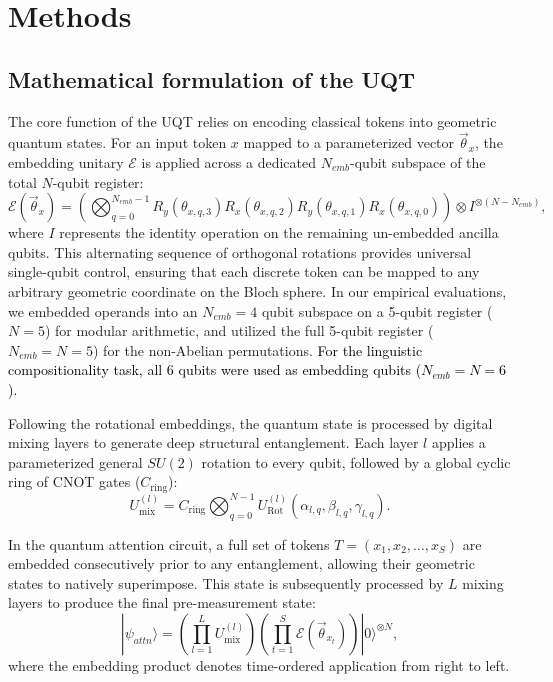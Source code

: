 \documentclass[11pt, a4paper]{article}
\begin{document}
\section*{Methods}\label{sec:methods}
\subsection*{Mathematical formulation of the UQT}
The core function of the UQT relies on encoding classical tokens into geometric quantum states. For an input token $x$ mapped to a parameterized vector $\vec{\theta}_x$, the embedding unitary $\mathcal{E}$ is applied across a dedicated $N_{emb}$-qubit subspace of the total $N$-qubit register:
\begin{equation}
    \mathcal{E}(\vec{\theta}_x) = \left( \bigotimes_{q=0}^{N_{emb}-1} R_y(\theta_{x, q, 3}) R_x(\theta_{x, q, 2}) R_y(\theta_{x, q, 1}) R_x(\theta_{x, q, 0}) \right) \otimes I^{\otimes (N - N_{emb})},
\end{equation}
where $I$ represents the identity operation on the remaining un-embedded ancilla qubits. This alternating sequence of orthogonal rotations provides universal single-qubit control, ensuring that each discrete token can be mapped to any arbitrary geometric coordinate on the Bloch sphere. In our empirical evaluations, we embedded operands into an $N_{emb}=4$ qubit subspace on a 5-qubit register ($N=5$) for modular arithmetic, and utilized the full 5-qubit register ($N_{emb}=N=5$) for the non-Abelian permutations. \textcolor{black}{For the linguistic compositionality task, all 6 qubits were used as embedding qubits ($N_{emb}=N=6$).}

Following the rotational embeddings, the quantum state is processed by digital mixing layers to generate deep structural entanglement. Each layer $l$ applies a parameterized general $SU(2)$ rotation to every qubit, followed by a global cyclic ring of CNOT gates ($C_{\mathrm{ring}}$):
\begin{equation}
    U_{\mathrm{mix}}^{(l)} = C_{\mathrm{ring}} \bigotimes_{q=0}^{N-1} U_{\mathrm{Rot}}^{(l)}\left(\alpha_{l,q}, \beta_{l,q}, \gamma_{l,q}\right).
\end{equation}

In the quantum attention circuit, a full set of tokens $T = (x_1, x_2, \dots, x_S)$ are embedded consecutively prior to any entanglement, allowing their geometric states to natively superimpose. This state is subsequently processed by $L$ mixing layers to produce the final pre-measurement state:
\begin{equation}
    |\psi_{attn}\rangle = \left( \prod_{l=1}^{L} U_{\mathrm{mix}}^{(l)} \right) \left( \prod_{t=1}^{S} \mathcal{E}(\vec{\theta}_{x_t}) \right) |0\rangle^{\otimes N},
\end{equation}
where the embedding product denotes time-ordered application from right to left.
\end{document}

